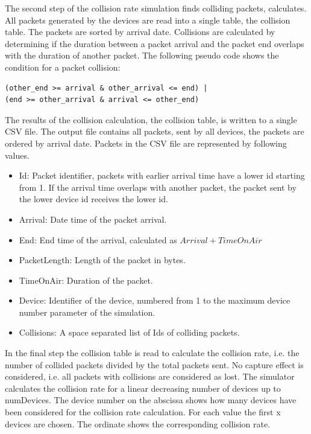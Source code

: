 \documentclass{article}
\begin{document}
The second step of the collision rate simulation finds colliding packets,
calculates. All packets generated by the devices are read into a single table,
the collision table. The packets are sorted by arrival date. Collisions are
calculated by determining if the duration between a packet arrival and the
packet end overlaps with the duration of another packet. The following pseudo
code shows the condition for a packet collision:

\begin{lstlisting}
(other_end >= arrival & other_arrival <= end) |
(end >= other_arrival & arrival <= other_end)
\end{lstlisting}

The results of the collision calculation, the collision table, is written to a
single CSV file. The output file contains all packets, sent by all devices, the
packets are ordered by arrival date. Packets in the CSV file are represented by
following values.

\begin{itemize}
        \item Id: Packet identifier, packets with earlier arrival time have a
                lower id starting from 1. If the arrival time overlaps with
                another packet, the packet sent by the lower device id receives
                the lower id.

        \item Arrival: Date time of the packet arrival. 

        \item End: End time of the arrival, calculated as $Arrival + TimeOnAir$

        \item PacketLength: Length of the packet in bytes.

        \item TimeOnAir: Duration of the packet.

        \item Device: Identifier of the device, numbered from 1 to the maximum
                device number parameter of the simulation.

        \item Collisions: A space separated list of Ids of colliding packets.
\end{itemize}
\vspace*{\baselineskip}

In the final step the collision table is read to calculate the collision rate,
i.e. the number of collided packets divided by the total packets sent.  No
capture effect is considered, i.e. all packets with collisions are considered
as lost. The simulator calculates the collision rate for a linear decreasing
number of devices up to numDevices. The device number on the abscissa shows how
many devices have been considered for the collision rate calculation. For each
value the first x devices are chosen. The ordinate shows the corresponding
collision rate.
\end{document}
